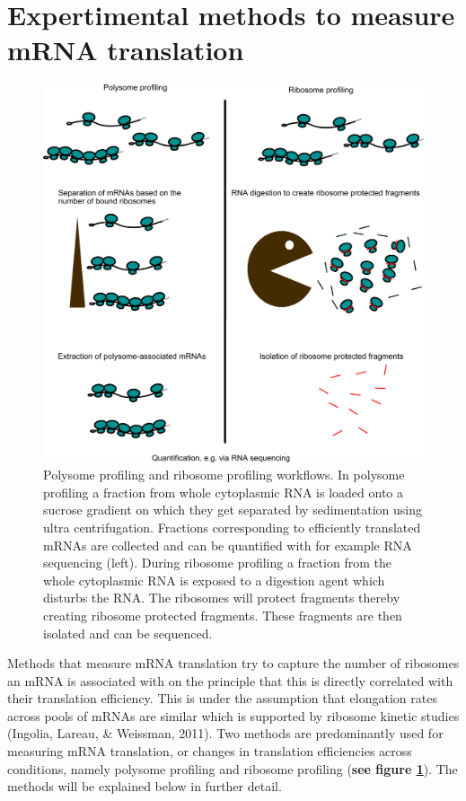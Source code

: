 \documentclass[
  12pt,
  openany]{book}
\begin{document}
\section{Expertimental methods to measure mRNA translation} \label{exptMethod}
\begin{figure}
    \includegraphics{./figures/polyRibo.pdf}
  \caption{Polysome profiling and ribosome profiling workflows. In polysome profiling a fraction from whole cytoplasmic RNA is loaded onto a sucrose gradient on which they get separated by sedimentation using ultra centrifugation. Fractions corresponding to efficiently translated mRNAs are collected and can be quantified with for example RNA sequencing (left). During ribosome profiling a fraction from the whole cytoplasmic RNA is exposed to a digestion agent which disturbs the RNA. The ribosomes will protect fragments thereby creating ribosome protected fragments. These fragments are then isolated and can be sequenced.  \label{fig:polyRibo}}
\end{figure}

Methods that measure mRNA translation try to capture the number of ribosomes an mRNA is associated with on the principle that this is directly correlated with their translation efficiency. This is under the assumption that elongation rates across pools of mRNAs are similar which is supported by ribosome kinetic studies (Ingolia, Lareau, \& Weissman, 2011). Two methods are predominantly used for measuring mRNA translation, or changes in translation efficiencies across conditions, namely polysome profiling and ribosome profiling (\textbf{see figure \ref{fig:polyRibo}}). The methods will be explained below in further detail.
\end{document}
